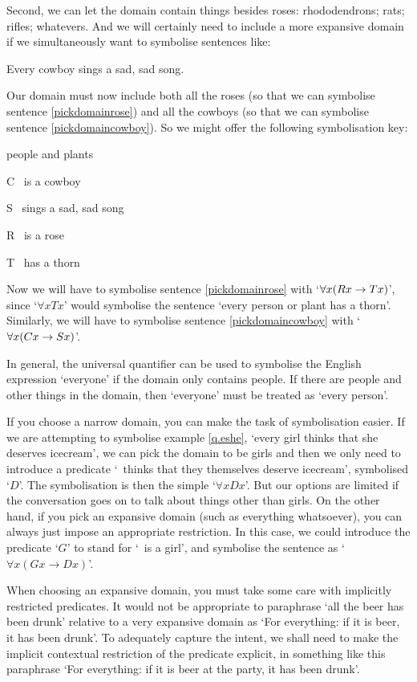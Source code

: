 Second, we can let the domain contain things besides roses: rhododendrons; rats; rifles; whatevers.  And we will certainly need to include a more expansive domain if we simultaneously want to symbolise sentences like:
	\begin{earg}
		\item[\ex{pickdomaincowboy}] Every cowboy sings a sad, sad song.
	\end{earg}
Our domain must now include both all the roses (so that we can symbolise sentence \ref{pickdomainrose}) and all the cowboys (so that we can symbolise sentence \ref{pickdomaincowboy}). So we might offer the following symbolisation key:\label{poison}
	\begin{ekey}
		\item[\text{domain}] people and plants
		\item[C] \blank\ is a cowboy
		\item[S] \blank\ sings a sad, sad song
		\item[R] \blank\ is a rose
		\item[T] \blank\ has a thorn
	\end{ekey}
Now we will have to symbolise sentence \ref{pickdomainrose} with `$\forall x (Rx \rightarrow Tx)$', since `$\forall x Tx$' would symbolise the sentence `every person or plant has a thorn'. Similarly, we will have to symbolise sentence \ref{pickdomaincowboy} with `$\forall x (Cx \rightarrow Sx)$'. 

In general, the universal quantifier can be used to symbolise the English expression `everyone' if the domain only contains people. If there are people and other things in the domain, then `everyone' must be treated as `every person'.

If you choose a narrow domain, you can make the task of symbolisation easier. If we are attempting to symbolise example \ref{q.eshe}, `every girl thinks that she deserves icecream', we can pick the domain to be girls and then we only need to introduce a predicate `\blank\ thinks that they themselves deserve icecream', symbolised `$D$'. The symbolisation is then the simple `$\forall x Dx$'. But our options are limited if the conversation goes on to talk about things other than girls. On the other hand, if you pick an expansive domain (such as everything whatsoever), you can always just impose an appropriate restriction. In this case, we could introduce the predicate `$G$' to stand for `\blank\ is a girl', and symbolise the sentence as `$\forall x (Gx \to Dx)$'. 

When choosing an expansive domain, you must take some care with implicitly restricted predicates. It would not be appropriate to paraphrase `all the beer has been drunk' relative to a very expansive domain as `For everything: if it is beer, it has been drunk'. To adequately capture the intent, we shall need to make the implicit contextual restriction of the predicate explicit, in something like this paraphrase `For everything: if it is beer at the party, it has been drunk'.


